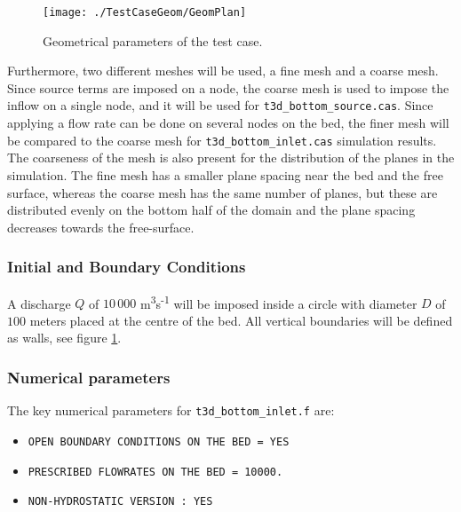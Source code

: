\begin{figure}[t!]
\begin{center}
	\texttt{[image: ./TestCaseGeom/GeomPlan]}
\end{center}
\caption{Geometrical parameters of the test case.}
\label{fig:GeomPlan}
\end{figure}

Furthermore, two different meshes will be used, a fine mesh and a coarse mesh. Since source terms are imposed on a node, the coarse mesh is used to impose the inflow on a single node, and it will be used for \texttt{t3d\_bottom\_source.cas}. Since applying a flow rate can be done on several nodes on the bed, the finer mesh will be compared to the coarse mesh for \texttt{t3d\_bottom\_inlet.cas} simulation results. The coarseness of the mesh is also present for the distribution of the planes in the simulation. The fine mesh has a smaller plane spacing near the bed and the free surface, whereas the coarse mesh has the same number of planes, but these are distributed evenly on the bottom half of the domain and the plane spacing decreases towards the free-surface.

%
%
\subsubsection{Initial and Boundary Conditions}
%
A discharge $Q$ of $10\,000$ m\textsuperscript{3}s\textsuperscript{-1} will be imposed inside a circle with diameter $D$ of $100$ meters placed at the centre of the bed. All vertical boundaries will be defined as walls, see figure \ref{fig:GeomPlan}.


%
%
\subsubsection{Numerical parameters}
%
The key numerical parameters for \texttt{t3d\_bottom\_inlet.f} are:

\begin{itemize}
\item \texttt{OPEN BOUNDARY CONDITIONS ON THE BED = YES}
\item \texttt{PRESCRIBED FLOWRATES ON THE BED = 10000.}
\item \texttt{NON-HYDROSTATIC VERSION : YES}
\end{itemize}

